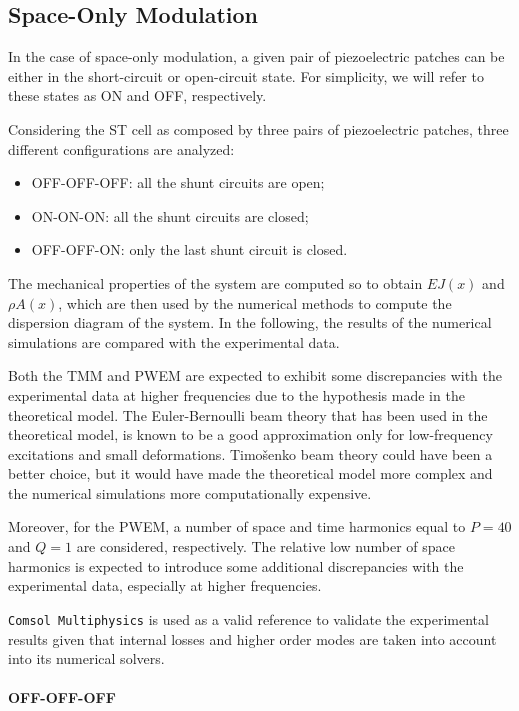 \subsection{Space-Only Modulation}
\label{subsec:space_only_modulation}

In the case of space-only modulation, a given pair of piezoelectric patches can be either in the short-circuit or open-circuit state.
For simplicity, we will refer to these states as ON and OFF, respectively.

Considering the ST cell as composed by three pairs of piezoelectric patches, three different configurations are analyzed:

\begin{itemize}
    \item OFF-OFF-OFF: all the shunt circuits are open;
    \item ON-ON-ON: all the shunt circuits are closed;
    \item OFF-OFF-ON: only the last shunt circuit is closed.
\end{itemize}

The mechanical properties of the system are computed so to obtain $EJ(x)$ and $\rho A(x)$, which are then used by the numerical methods to compute the dispersion diagram of the system.
In the following, the results of the numerical simulations are compared with the experimental data.

Both the TMM and PWEM are expected to exhibit some discrepancies with the experimental data at higher frequencies due to the hypothesis made in the theoretical model.
The Euler-Bernoulli beam theory that has been used in the theoretical model, is known to be a good approximation only for low-frequency excitations and small deformations.
Timošenko beam theory could have been a better choice, but it would have made the theoretical model more complex and the numerical simulations more computationally expensive.

Moreover, for the PWEM, a number of space and time harmonics equal to $P = 40$ and $Q = 1$ are considered, respectively.
The relative low number of space harmonics is expected to introduce some additional discrepancies with the experimental data, especially at higher frequencies.

\texttt{Comsol Multiphysics} is used as a valid reference to validate the experimental results given that internal losses and higher order modes are taken into account into its numerical solvers.


\paragraph{OFF-OFF-OFF}

